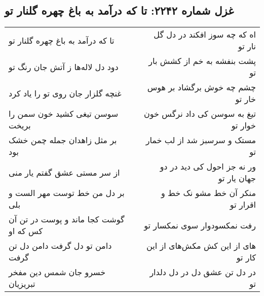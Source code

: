 \begin{center}
\section*{غزل شماره ۲۲۴۲: تا که درآمد به باغ چهره گلنار تو}
\label{sec:2242}
\begin{longtable}{l p{0.5cm} r}
تا که درآمد به باغ چهره گلنار تو
&&
اه که چه سوز افکند در دل گل نار تو
\\
دود دل لاله‌ها ز آتش جان رنگ تو
&&
پشت بنفشه به خم از کشش بار تو
\\
غنچه گلزار جان روی تو را یاد کرد
&&
چشم چه خوش برگشاد بر هوس خار تو
\\
سوسن تیغی کشید خون سمن را بریخت
&&
تیغ به سوسن کی داد نرگس خون خوار تو
\\
بر مثل زاهدان جمله چمن خشک بود
&&
مستک و سرسبز شد از لب خمار تو
\\
از سر مستی عشق گفتم یار منی
&&
ور نه جز احول کی دید در دو جهان یار تو
\\
بر دل من خط توست مهر الست و بلی
&&
منکر آن خط مشو نک خط و اقرار تو
\\
گوشت کجا ماند و پوست در تن آن کس که او
&&
رفت نمکسودوار سوی نمکسار تو
\\
دامن تو دل گرفت دامن دل تن گرفت
&&
های از این کش مکش‌های از این کار تو
\\
خسرو جان شمس دین مفخر تبریزیان
&&
در دل تن عشق دل در دل دلدار تو
\\
\end{longtable}
\end{center}
